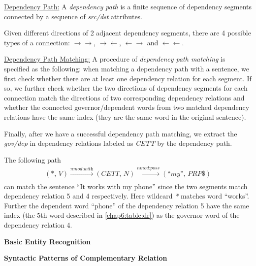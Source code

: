 \underline{Dependency Path:} \label{defn:path}
A \textit{dependency path} is a finite sequence of dependency segments connected by a sequence of \textit{src/dst} attributes.

Given different directions of 2 adjacent dependency segments, there are 4 possible types of a connection: $\rightarrow \rightarrow$, $\rightarrow \leftarrow$, $\leftarrow \rightarrow$ and $\leftarrow \leftarrow$.

\underline{Dependency Path Matching:} \label{defn:match2} 
A procedure of \emph{dependency path matching} is specified as the following: when matching a dependency path with a sentence, we first check whether there are at least one dependency relation for each segment. If so, we further check whether the two directions of dependency segments for each connection match the directions of two corresponding dependency relations and whether the connected governor/dependent words from two matched dependency relations have the same index (they are the same word in the original sentence).

Finally, after we have a successful dependency path matching, we extract the \textit{gov/dep} in dependency relations labeled as \textit{CETT} by the dependency path.

The following path
\begin{equation}
\label{eq:l2}
\begin{split}
(\textit{*, V})\xrightarrow[]{\textit{nmod:with}}(\textit{CETT, N})\xrightarrow[]{\textit{nmod:poss}}(\textit{``my'', PRP\$})
\end{split}
\end{equation}
can match the sentence ``It works with my phone'' since the two segments match dependency relation 5 and 4 respectively. Here wildcard \textit{*} matches word ``works''. Further the dependent word ``phone'' of the dependency relation 5 have the same index (the 5th word described in \ref{chap6:table:dr}) as the governor word of the dependency relation 4. 

\textbf{Basic Entity Recognition}
\label{sec:r}

\textbf{Syntactic Patterns of Complementary Relation}

